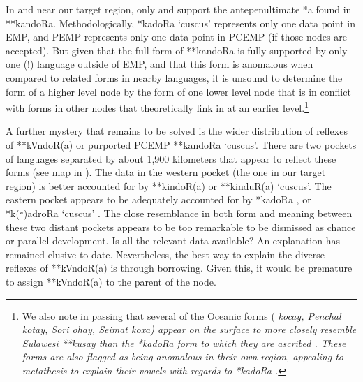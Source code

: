 In and near our target region,
only  and  support the antepenultimate *a found in **kandoRa.
Methodologically,  *kadoRa ‘cuscus’ represents only
one data point in EMP,
and PEMP represents only one data point in PCEMP (if those nodes are accepted).
But given that the full form of **kandoRa is fully supported
by only one (!) language outside of EMP,
and that this form is anomalous when compared to related forms
in nearby languages, it is unsound to determine the form of a higher level node by
the form of one lower level node that is in conflict with forms
in other nodes that theoretically link in at an earlier level.\footnote{
		We also note in passing that several of the Oceanic forms (
		\it{kocay}, Penchal \it{kotay}, Sori \it{ohay},
		Seimat \it{koxa}) appear on the surface to more closely resemble
		Sulawesi **kusay than the  *kadoRa form to which they
		are ascribed \citep{BlustTrussel2020}.
		These forms are also flagged as being anomalous in their own
		region, appealing to metathesis to explain their vowels with regards
		to  *kadoRa \citep[241]{Blust1982}.}

A further mystery that remains to be solved is the wider distribution
of reflexes of **kVndoR(a) or purported PCEMP **kandoRa ‘cuscus’.
There are two pockets of languages separated by about 1,900 kilometers
that appear to reflect these forms (see map in \citealp[62]{Schapper2011}).
The data in the western pocket (the one in our target region)
is better accounted for by **kindoR(a) or **kinduR(a) ‘cuscus’.
The eastern pocket appears to be adequately accounted for by
 *kadoRa \citep[241]{Blust1982},
or  *k(ʷ)adroRa ‘cuscus’ \citep[225]{OsmondPawley2011}.
The close resemblance in both form
and meaning between these two distant pockets appears to be too
remarkable to be dismissed as chance or parallel development.
Is all the relevant data available? An explanation has remained elusive to date.
Nevertheless, the best way to explain the diverse reflexes of
**kVndoR(a) is through borrowing.
Given this, it would be premature to assign **kVndoR(a) to the
parent of the  node.